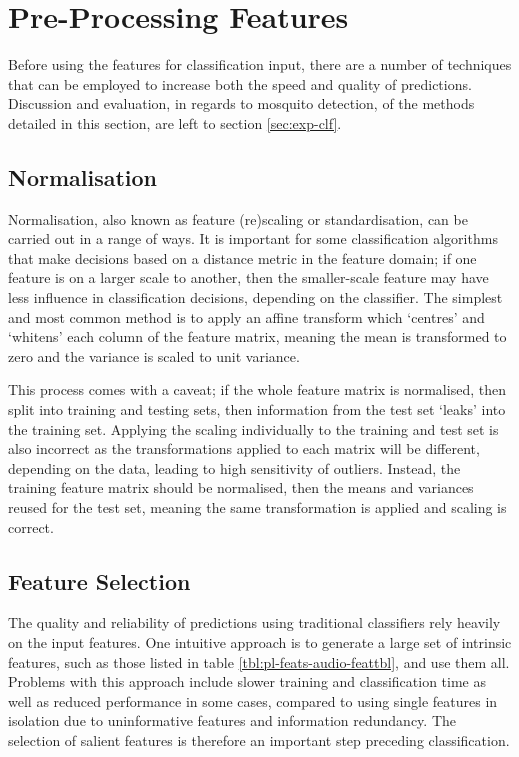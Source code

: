 \section{Pre-Processing Features}
\label{sec:pl-featpreproc}
    Before using the features for classification input, there are a number of techniques that can be employed to increase both the speed and quality of predictions. Discussion and evaluation, in regards to mosquito detection, of the methods detailed in this section, are left to section \ref{sec:exp-clf}.

    \subsection{Normalisation}
    \label{subsec:pl-featpreproc-norm}
        Normalisation, also known as feature (re)scaling or standardisation, can be carried out in a range of ways. It is important for some classification algorithms that make decisions based on a distance metric in the feature domain; if one feature is on a larger scale to another, then the smaller-scale feature may have less influence in classification decisions, depending on the classifier.     
        The simplest and most common method is to apply an affine transform which `centres' and `whitens' each column of the feature matrix, meaning the mean is transformed to zero and the variance is scaled to unit variance.
        
        This process comes with a caveat; if the whole feature matrix is normalised, then split into training and testing sets, then information from the test set `leaks' into the training set. Applying the scaling individually to the training and test set is also incorrect as the transformations applied to each matrix will be different, depending on the data, leading to high sensitivity of outliers. Instead, the training feature matrix should be normalised, then the means and variances reused for the test set, meaning the same transformation is applied and scaling is correct.

    \subsection{Feature Selection}
    \label{subsec:pl-featpreproc-sel}
        The quality and reliability of predictions using traditional classifiers rely heavily on the input features. One intuitive approach is to generate a large set of intrinsic features, such as those listed in table \ref{tbl:pl-feats-audio-feattbl}, and use them all. Problems with this approach include slower training and classification time as well as reduced performance in some cases, compared to using single features in isolation due to uninformative features and information redundancy. The selection of salient features is therefore an important step preceding classification. 
        
